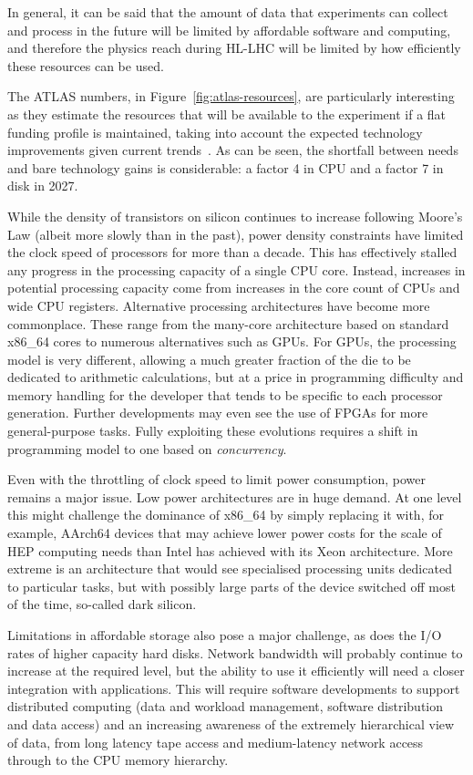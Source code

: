 \documentclass[twocolumn]{svjour3}          %
\begin{document}
In general, it can be said that the amount of data that experiments can
collect and process in the future will be limited by affordable software
and computing, and therefore the physics reach during HL-LHC will be
limited by how efficiently these resources can be used.

The ATLAS numbers, in Figure~\ref{fig:atlas-resources}, are particularly interesting as they
estimate the resources that will be available to the experiment if a
flat funding profile is maintained, taking into account the expected
technology improvements given current trends~\cite{Panzer2017}. As can be
seen, the shortfall between needs and bare technology gains is
considerable: a factor 4 in CPU and a factor 7 in disk in 2027.

While the density of transistors on silicon continues to increase
following Moore's Law (albeit more slowly than in the past), power
density constraints have limited the clock speed of processors for more
than a decade. This has effectively stalled any progress in the
processing capacity of a single CPU core. Instead, increases in
potential processing capacity come from increases in the core count of
CPUs and wide CPU registers. Alternative processing architectures have
become more commonplace. These range from the many-core architecture
based on standard x86\_64 cores to numerous alternatives such as GPUs.
For GPUs, the processing model is very different, allowing a much
greater fraction of the die to be dedicated to arithmetic calculations,
but at a price in programming difficulty and memory handling for the
developer that tends to be specific to each processor generation.
Further developments may even see the use of FPGAs for more
general-purpose tasks. Fully exploiting these evolutions requires a
shift in programming model to one based on \emph{concurrency}.

Even with the throttling of clock speed to limit power consumption,
power remains a major issue. Low power architectures are in huge demand.
At one level this might challenge the dominance of x86\_64 by simply
replacing it with, for example, AArch64 devices that may achieve lower power
costs for the scale of HEP computing needs than Intel has achieved with its
Xeon architecture. More extreme is an architecture that would see
specialised processing units dedicated to particular tasks, but with
possibly large parts of the device switched off most of the time,
so-called dark silicon.

Limitations in affordable storage also pose a major challenge, as does
the I/O rates of higher capacity hard disks. Network
bandwidth will probably continue to increase at the required level, but
the ability to use it efficiently will need a closer integration with
applications. This will require software developments to
support distributed computing (data and workload management, software
distribution and data access) and an increasing awareness of the
extremely hierarchical view of data, from long latency tape access and
medium-latency network access through to the CPU memory hierarchy.
\end{document}
